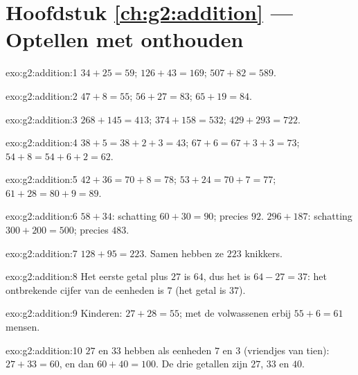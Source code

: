 \section*{Hoofdstuk \ref{ch:g2:addition} --- Optellen met onthouden}

\begin{solution}{exo:g2:addition:1}
$34 + 25 = 59$; \quad $126 + 43 = 169$; \quad $507 + 82 = 589$.
\end{solution}

\begin{solution}{exo:g2:addition:2}
$47 + 8 = 55$; \quad $56 + 27 = 83$; \quad $65 + 19 = 84$.
\end{solution}

\begin{solution}{exo:g2:addition:3}
$268 + 145 = 413$; \quad $374 + 158 = 532$; \quad
$429 + 293 = 722$.
\end{solution}

\begin{solution}{exo:g2:addition:4}
$38 + 5 = 38 + 2 + 3 = 43$; \quad $67 + 6 = 67 + 3 + 3 = 73$; \quad
$54 + 8 = 54 + 6 + 2 = 62$.
\end{solution}

\begin{solution}{exo:g2:addition:5}
$42 + 36 = 70 + 8 = 78$; \quad $53 + 24 = 70 + 7 = 77$; \quad
$61 + 28 = 80 + 9 = 89$.
\end{solution}

\begin{solution}{exo:g2:addition:6}
$58 + 34$: schatting $60 + 30 = 90$; precies $92$.
$296 + 187$: schatting $300 + 200 = 500$; precies $483$.
\end{solution}

\begin{solution}{exo:g2:addition:7}
$128 + 95 = 223$. Samen hebben ze $223$ knikkers.
\end{solution}

\begin{solution}{exo:g2:addition:8}
Het eerste getal plus $27$ is $64$, dus het is $64 - 27 = 37$: het
ontbrekende cijfer van de eenheden is $7$ (het getal is $37$).
\end{solution}

\begin{solution}{exo:g2:addition:9}
Kinderen: $27 + 28 = 55$; met de volwassenen erbij $55 + 6 = 61$
mensen.
\end{solution}

\begin{solution}{exo:g2:addition:10}
$27$ en $33$ hebben als eenheden $7$ en $3$ (vriendjes van tien):
$27 + 33 = 60$, en dan $60 + 40 = 100$. De drie getallen zijn $27$,
$33$ en $40$.
\end{solution}
